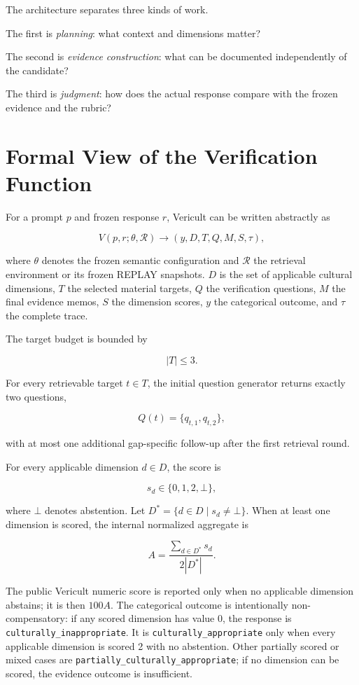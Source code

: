 The architecture separates three kinds of work.

The first is \emph{planning}: what context and dimensions matter?

The second is \emph{evidence construction}: what can be documented independently of the candidate?

The third is \emph{judgment}: how does the actual response compare with the frozen evidence and the rubric?

\section{Formal View of the Verification Function}

For a prompt $p$ and frozen response $r$, Vericult can be written abstractly as

\[
V(p,r;\theta,\mathcal{R}) \rightarrow (y, D, T, Q, M, S, \tau),
\]

where $\theta$ denotes the frozen semantic configuration and $\mathcal{R}$ the retrieval environment or its frozen REPLAY snapshots. $D$ is the set of applicable cultural dimensions, $T$ the selected material targets, $Q$ the verification questions, $M$ the final evidence memos, $S$ the dimension scores, $y$ the categorical outcome, and $\tau$ the complete trace.

The target budget is bounded by

\[ |T| \leq 3. \]

For every retrievable target $t\in T$, the initial question generator returns exactly two questions,

\[ Q(t)=\{q_{t,1},q_{t,2}\}, \]

with at most one additional gap-specific follow-up after the first retrieval round.

For every applicable dimension $d\in D$, the score is

\[ s_d \in \{0,1,2,\bot\}, \]

where $\bot$ denotes abstention. Let $D^{*}=\{d\in D\mid s_d\neq\bot\}$. When at least one dimension is scored, the internal normalized aggregate is

\[ A = \frac{\sum_{d\in D^{*}} s_d}{2|D^{*}|}. \]

The public Vericult numeric score is reported only when no applicable dimension abstains; it is then $100A$. The categorical outcome is intentionally non-compensatory: if any scored dimension has value 0, the response is \texttt{culturally\_inappropriate}. It is \texttt{culturally\_appropriate} only when every applicable dimension is scored 2 with no abstention. Other partially scored or mixed cases are \texttt{partially\_culturally\_appropriate}; if no dimension can be scored, the evidence outcome is insufficient.

